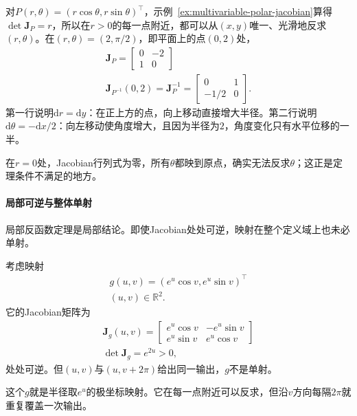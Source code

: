 \begin{example}[极坐标的局部反函数]
\label{ex:multivariable-polar-local-inverse}
对$P(r,\theta)=(r\cos\theta,r\sin\theta)^\top$，示例~\ref{ex:multivariable-polar-jacobian}算得$\det\bm J_P=r$，所以在$r>0$的每一点附近，都可以从$(x,y)$唯一、光滑地反求$(r,\theta)$。在$(r,\theta)=(2,\pi/2)$，即平面上的点$(0,2)$处，
\[
\begin{gathered}
\bm J_P=\begin{bmatrix}0&-2\\1&0\end{bmatrix}\\
\bm J_{P^{-1}}(0,2)=\bm J_P^{-1}=\begin{bmatrix}0&1\\-1/2&0\end{bmatrix}.
\end{gathered}
\]
第一行说明$\mathrm dr=\mathrm dy$：在正上方的点，向上移动直接增大半径。第二行说明$\mathrm d\theta=-\mathrm dx/2$：向左移动使角度增大，且因为半径为$2$，角度变化只有水平位移的一半。
\end{example}

在$r=0$处，Jacobian行列式为零，所有$\theta$都映到原点，确实无法反求$\theta$；这正是定理条件不满足的地方。

\paragraph{局部可逆与整体单射}

局部反函数定理是局部结论。即使Jacobian处处可逆，映射在整个定义域上也未必单射。
\begin{example}[Jacobian处处可逆而不单射]
\label{ex:multivariable-local-not-global-inverse}
考虑映射
\[
\begin{gathered}
g(u,v)=(e^u\cos v,e^u\sin v)^\top\\
(u,v)\in\mathbb R^2.
\end{gathered}
\]
它的Jacobian矩阵为
\[
\begin{gathered}
\bm J_g(u,v)=\begin{bmatrix}e^u\cos v&-e^u\sin v\\ e^u\sin v&e^u\cos v\end{bmatrix}\\
\det\bm J_g=e^{2u}>0,
\end{gathered}
\]
处处可逆。但$(u,v)$与$(u,v+2\pi)$给出同一输出，$g$不是单射。
\end{example}

这个$g$就是半径取$e^u$的极坐标映射。它在每一点附近可以反求，但沿$v$方向每隔$2\pi$就重复覆盖一次输出。


